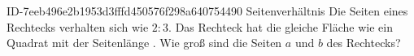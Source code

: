 \begin{exercise}
      {ID-7eeb496e2b1953d3fffd450576f298a640754490}
      {Seitenverhältnis}
  \ifproblem\problem
    Die Seiten eines Rechtecks verhalten sich wie $2:3$. Das Rechteck hat
    die gleiche Fläche wie ein Quadrat mit der Seitenlänge .
    Wie groß sind die Seiten $a$ und $b$ des Rechtecks?
  \fi
\end{exercise}
